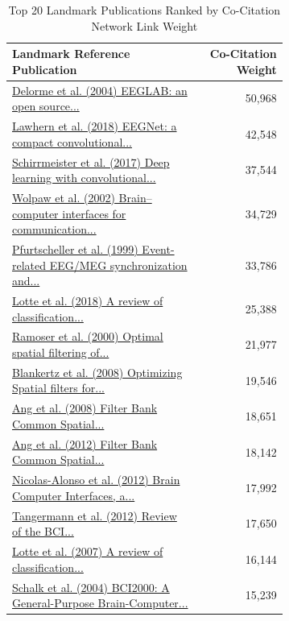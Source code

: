 \begin{table}[htbp]
\caption{Top 20 Landmark Publications Ranked by Co-Citation Network Link Weight}
\label{tab:top_references_pagerank}
\footnotesize
\begin{tabular}{p{0.68\linewidth} r}
\toprule
\textbf{Landmark Reference Publication} & \textbf{Co-Citation Weight} \\
\midrule
\href{https://doi.org/10.1016/j.jneumeth.2003.10.009}{Delorme et al. (2004) EEGLAB: an open source...} & 50,968 \\
\href{https://doi.org/10.1088/1741-2552/aace8c}{Lawhern et al. (2018) EEGNet: a compact convolutional...} & 42,548 \\
\href{https://doi.org/10.1002/hbm.23730}{Schirrmeister et al. (2017) Deep learning with convolutional...} & 37,544 \\
\href{https://doi.org/10.1016/s1388-2457(02)00057-3}{Wolpaw et al. (2002) Brain–computer interfaces for communication...} & 34,729 \\
\href{https://doi.org/10.1016/s1388-2457(99)00141-8}{Pfurtscheller et al. (1999) Event-related EEG/MEG synchronization and...} & 33,786 \\
\href{https://doi.org/10.1088/1741-2552/aab2f2}{Lotte et al. (2018) A review of classification...} & 25,388 \\
\href{https://doi.org/10.1109/86.895946}{Ramoser et al. (2000) Optimal spatial filtering of...} & 21,977 \\
\href{https://doi.org/10.1109/msp.2008.4408441}{Blankertz et al. (2008) Optimizing Spatial filters for...} & 19,546 \\
\href{https://doi.org/10.1109/ijcnn.2008.4634130}{Ang et al. (2008) Filter Bank Common Spatial...} & 18,651 \\
\href{https://doi.org/10.3389/fnins.2012.00039}{Ang et al. (2012) Filter Bank Common Spatial...} & 18,142 \\
\href{https://doi.org/10.3390/s120201211}{Nicolas-Alonso et al. (2012) Brain Computer Interfaces, a...} & 17,992 \\
\href{https://doi.org/10.3389/fnins.2012.00055}{Tangermann et al. (2012) Review of the BCI...} & 17,650 \\
\href{https://doi.org/10.1088/1741-2560/4/2/r01}{Lotte et al. (2007) A review of classification...} & 16,144 \\
\href{https://doi.org/10.1109/tbme.2004.827072}{Schalk et al. (2004) BCI2000: A General-Purpose Brain-Computer...} & 15,239 \\

\end{tabular}
\end{table}
